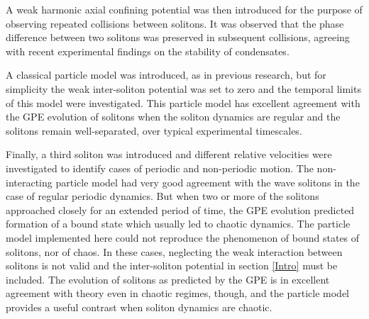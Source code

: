 \documentclass[10pt, twocolumn]{revtex4}    %
\begin{document}
A weak harmonic axial confining potential was then introduced for the purpose of observing repeated collisions between solitons. It was observed that the phase difference between two solitons was preserved in subsequent collisions, agreeing with recent experimental findings on the stability of condensates.  

A classical particle model was introduced, as in previous research, but for simplicity the weak inter-soliton potential was set to zero and the temporal limits of this model were investigated. This particle model has excellent agreement with the GPE evolution of solitons when the soliton dynamics are regular and the solitons remain well-separated, over typical experimental timescales. 

Finally, a third soliton was introduced and different relative velocities were investigated to identify cases of periodic and non-periodic motion. The non-interacting particle model had very good agreement with the wave solitons in the case of regular periodic dynamics. But when two or more of the solitons approached closely for an extended period of time, the GPE evolution predicted formation of a bound state which usually led to chaotic dynamics. The particle model implemented here could not reproduce the phenomenon of bound states of solitons, nor of chaos. In these cases, neglecting the weak interaction between solitons is not valid and the inter-soliton potential in section \ref{Intro} must be included. The evolution of solitons as predicted by the GPE is in excellent agreement with theory even in chaotic regimes, though, and the particle model provides a useful contrast when soliton dynamics are chaotic. 


\end{document}
